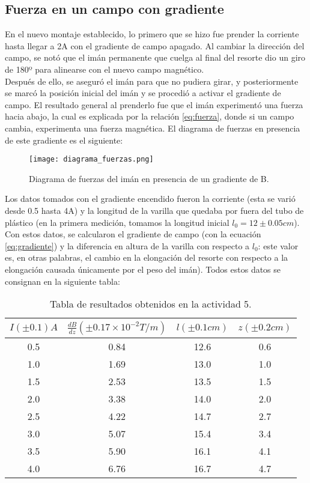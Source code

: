 \documentclass[%
 reprint,
 amsmath,amssymb,
 aps,
]{revtex4-1}
\begin{document}
\subsection{Fuerza en un campo con gradiente}

En el nuevo montaje establecido, lo primero que se hizo fue prender la corriente hasta llegar a 2A con el gradiente de campo apagado. Al cambiar la dirección del campo, se notó que el imán permanente que cuelga al final del resorte dio un giro de 180º para alinearse con el nuevo campo magnético.\\
Después de ello, se aseguró el imán para que no pudiera girar, y posteriormente se marcó la posición inicial del imán y se procedió a activar el gradiente de campo. El resultado general al prenderlo fue que el imán experimentó una fuerza hacia abajo, la cual es explicada por la relación \ref{eq:fuerza}, donde si un campo cambia, experimenta una fuerza magnética. El diagrama de fuerzas en presencia de este gradiente es el siguiente:

\begin{figure}[H]
    \centering
    \texttt{[image: diagrama\_fuerzas.png]}
    \caption{Diagrama de fuerzas del imán en presencia de un gradiente de B.}
    \label{fig:fuerzas}
\end{figure}

Los datos tomados con el gradiente encendido fueron la corriente (esta se varió desde 0.5 hasta 4A) y la longitud de la varilla que quedaba por fuera del tubo de plástico (en la primera medición, tomamos la longitud inicial $l_0 = 12 \pm 0.05 cm$). Con estos datos, se calcularon el gradiente de campo (con la ecuación \ref{eq:gradiente}) y la diferencia en altura de la varilla con respecto a $l_0$: este valor es, en otras palabras, el cambio en la elongación del resorte con respecto a la elongación causada únicamente por el peso del imán). Todos estos datos se consignan en la siguiente tabla:

\begin{table}[H]
    \centering
    \begin{tabular}{|c|c|c|c|}
        \hline
        $I (\pm 0.1) A$ & $\frac{dB}{dz} (\pm 0.17 \times 10^{-2} T/m)$ & $l(\pm 0.1 cm)$ & $z(\pm 0.2 cm)$\\ \hline
         0.5 & 0.84 & 12.6 & 0.6\\ \hline
         1.0 & 1.69 & 13.0 & 1.0\\ \hline
         1.5 & 2.53 & 13.5 & 1.5 \\ \hline
         2.0 & 3.38 & 14.0 & 2.0\\ \hline
         2.5 & 4.22 & 14.7 & 2.7 \\ \hline
         3.0 & 5.07 & 15.4 & 3.4\\ \hline
         3.5 & 5.90 & 16.1 & 4.1 \\ \hline
         4.0 & 6.76 & 16.7 & 4.7\\ \hline
    \end{tabular}
    \caption{Tabla de resultados obtenidos en la actividad 5.}
    \label{tab: tabla5}
\end{table}
\end{document}
